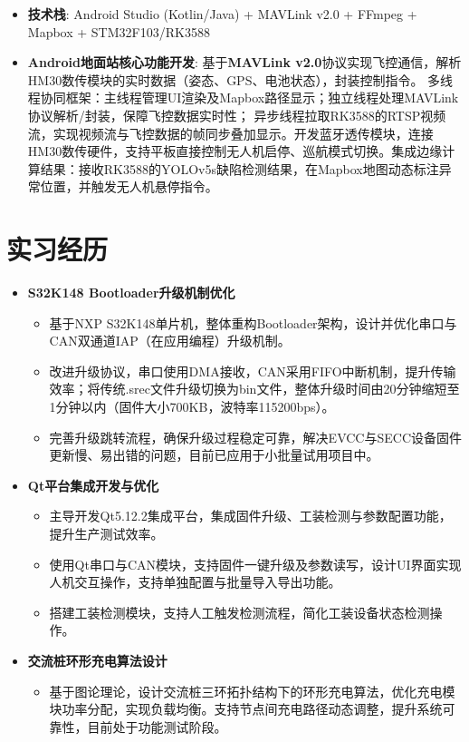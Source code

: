 \documentclass{resume}
\begin{document}
\begin{itemize}  
	\item \textbf{技术栈}: Android Studio (Kotlin/Java) + MAVLink v2.0 + FFmpeg + Mapbox + STM32F103/RK3588  
	\item \textbf{Android地面站核心功能开发}:  基于\textbf{MAVLink v2.0}协议实现飞控通信，解析HM30数传模块的实时数据（姿态、GPS、电池状态），封装控制指令。  多线程协同框架：主线程管理UI渲染及Mapbox路径显示；独立线程处理MAVLink协议解析/封装，保障飞控数据实时性； 异步线程拉取RK3588的RTSP视频流，实现视频流与飞控数据的帧同步叠加显示。开发蓝牙透传模块，连接HM30数传硬件，支持平板直接控制无人机启停、巡航模式切换。集成边缘计算结果：接收RK3588的YOLOv5s缺陷检测结果，在Mapbox地图动态标注异常位置，并触发无人机悬停指令。

\end{itemize}  

\section{实习经历}
\begin{itemize}
	\item \textbf{S32K148 Bootloader升级机制优化}
	\begin{itemize}
		\item 基于NXP S32K148单片机，整体重构Bootloader架构，设计并优化串口与CAN双通道IAP（在应用编程）升级机制。
		\item 改进升级协议，串口使用DMA接收，CAN采用FIFO中断机制，提升传输效率；将传统.srec文件升级切换为bin文件，整体升级时间由20分钟缩短至1分钟以内（固件大小700KB，波特率115200bps）。
		\item 完善升级跳转流程，确保升级过程稳定可靠，解决EVCC与SECC设备固件更新慢、易出错的问题，目前已应用于小批量试用项目中。
	\end{itemize}
	
	\item \textbf{Qt平台集成开发与优化}
	\begin{itemize}
		\item 主导开发Qt5.12.2集成平台，集成固件升级、工装检测与参数配置功能，提升生产测试效率。
		\item 使用Qt串口与CAN模块，支持固件一键升级及参数读写，设计UI界面实现人机交互操作，支持单独配置与批量导入导出功能。
		\item 搭建工装检测模块，支持人工触发检测流程，简化工装设备状态检测操作。
	\end{itemize}
	
	\item \textbf{交流桩环形充电算法设计}
	\begin{itemize}
		\item 基于图论理论，设计交流桩三环拓扑结构下的环形充电算法，优化充电模块功率分配，实现负载均衡。支持节点间充电路径动态调整，提升系统可靠性，目前处于功能测试阶段。
	\end{itemize}
\end{itemize}
\end{document}
